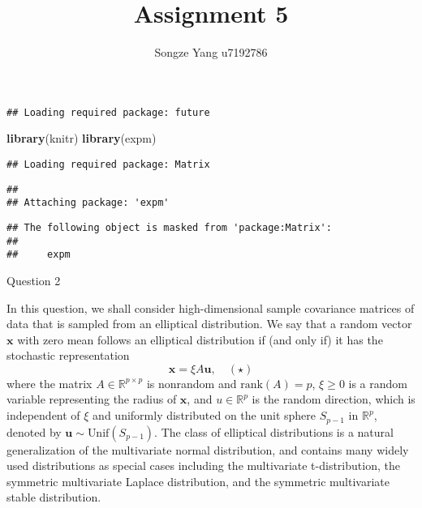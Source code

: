 \documentclass[
]{article}
\title{Assignment 5}
\author{Songze Yang u7192786}
\date{}
\newenvironment{Shaded}{\begin{snugshade}}{\end{snugshade}}
\newcommand{\AttributeTok}[1]{\textcolor[rgb]{0.13,0.29,0.53}{#1}}
\newcommand{\ConstantTok}[1]{\textcolor[rgb]{0.56,0.35,0.01}{#1}}
\newcommand{\FunctionTok}[1]{\textcolor[rgb]{0.13,0.29,0.53}{\textbf{#1}}}
\newcommand{\NormalTok}[1]{#1}
\newcommand{\SpecialCharTok}[1]{\textcolor[rgb]{0.81,0.36,0.00}{\textbf{#1}}}
\begin{document}
\maketitle

\begin{Shaded}
\end{Shaded}

\begin{verbatim}
## Loading required package: future
\end{verbatim}

\begin{Shaded}
\begin{Highlighting}[]
\FunctionTok{library}\NormalTok{(knitr)}
\FunctionTok{library}\NormalTok{(expm)}
\end{Highlighting}
\end{Shaded}

\begin{verbatim}
## Loading required package: Matrix
\end{verbatim}

\begin{verbatim}
## 
## Attaching package: 'expm'
\end{verbatim}

\begin{verbatim}
## The following object is masked from 'package:Matrix':
## 
##     expm
\end{verbatim}

Question 2

In this question, we shall consider high-dimensional sample covariance
matrices of data that is sampled from an elliptical distribution. We say
that a random vector \(\mathbf{x}\) with zero mean follows an elliptical
distribution if (and only if) it has the stochastic representation
\[ \mathbf{x} = \xi A \mathbf{u}, \quad (\star) \]where the matrix
\(A \in \mathbb{R}^{p \times p}\) is nonrandom and
\(\text{rank}(A) = p\), \(\xi \geq 0\) is a random variable representing
the radius of \(\mathbf{x}\), and \(u \in \mathbb{R}^p\) is the random
direction, which is independent of \(\xi\) and uniformly distributed on
the unit sphere \(S_{p-1}\) in \(\mathbb{R}^p\), denoted by
\(\mathbf{u} \sim \text{Unif}(S_{p-1})\). The class of elliptical
distributions is a natural generalization of the multivariate normal
distribution, and contains many widely used distributions as special
cases including the multivariate t-distribution, the symmetric
multivariate Laplace distribution, and the symmetric multivariate stable
distribution.
\end{document}
